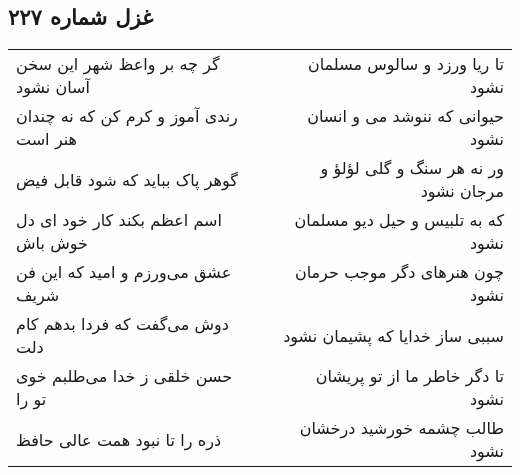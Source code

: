 \begin{center}
\section*{غزل شماره ۲۲۷}
\label{sec:sh227}
\begin{longtable}{l p{0.5cm} r}
گر چه بر واعظ شهر این سخن آسان نشود
&&
تا ریا ورزد و سالوس مسلمان نشود
\\
رندی آموز و کرم کن که نه چندان هنر است
&&
حیوانی که ننوشد می و انسان نشود
\\
گوهر پاک بباید که شود قابل فیض
&&
ور نه هر سنگ و گلی لؤلؤ و مرجان نشود
\\
اسم اعظم بکند کار خود ای دل خوش باش
&&
که به تلبیس و حیل دیو مسلمان نشود
\\
عشق می‌ورزم و امید که این فن شریف
&&
چون هنرهای دگر موجب حرمان نشود
\\
دوش می‌گفت که فردا بدهم کام دلت
&&
سببی ساز خدایا که پشیمان نشود
\\
حسن خلقی ز خدا می‌طلبم خوی تو را
&&
تا دگر خاطر ما از تو پریشان نشود
\\
ذره را تا نبود همت عالی حافظ
&&
طالب چشمه خورشید درخشان نشود
\\
\end{longtable}
\end{center}
